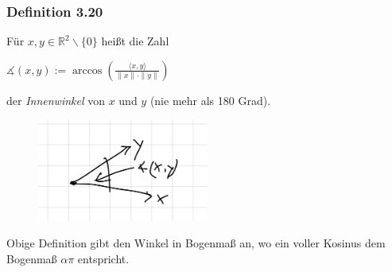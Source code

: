 \documentclass{article}
\begin{document}
\subsubsection*{Definition 3.20}
Für $x,y \in \mathbb{R}^2\backslash\{0\}$ heißt die Zahl \\
\begin{center}
    $\measuredangle (x,y) := \arccos \left( \frac{\langle x,y \rangle}{\|x\| \cdot \|y\|} \right)$
\end{center}
der \textit{Innenwinkel} von $x$ und $y$ (nie mehr als 180 Grad). \\
\begin{figure}[h]
    \centering
    \includegraphics[width=0.5\textwidth]{Images/3.20.jpeg}

\end{figure}
Obige Definition gibt den Winkel in Bogenmaß an, wo ein voller Kosinus dem Bogenmaß $\alpha \pi$ entspricht. \\
\\
\end{document}
